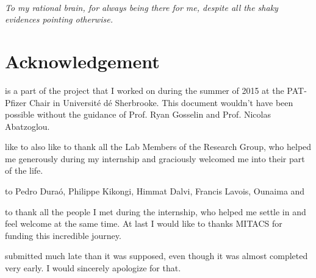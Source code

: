 \documentclass{tufte-book} %
\begin{document}
\cleardoublepage
~\vfill
\begin{doublespace}
\noindent\fontsize{18}{22}\selectfont\itshape
\nohyphenation
To my rational brain, for always being there for me, despite all the shaky evidences pointing otherwise. 
\end{doublespace}
\vfill
\vfill


\cleardoublepage
\chapter{Acknowledgement} %
\label{ch:0}

     is a part of the project that I
    worked on during the summer of 2015 at the PAT-Pfizer Chair in
    Universit\'e  d\'e  Sherbrooke. This document wouldn't have been
    possible without the guidance of Prof. Ryan Gosselin and
    Prof. Nicolas Abatzoglou. 

     like to also like to thank all the Lab Members of the Research Group, who helped me generously during my internship and graciously welcomed me into their part of the life.

    to Pedro Dura\'o, Philippe Kikongi, Himmat Dalvi, Francis Lavois, Ounaima  and 

    to thank all the people I met during the internship, who helped me settle in and feel welcome at the same time. At last I would like to thanks MITACS for funding this incredible journey.
    
     submitted much late than it was supposed, even though it was almost completed very early. I would sincerely apologize for that. 

   

    
    
 



\mainmatter
\end{document}
